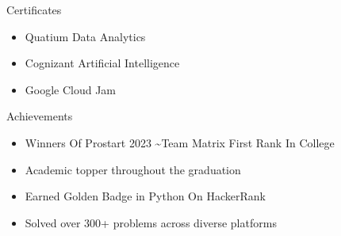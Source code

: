 \documentclass{resume} %
\begin{document}
\begin{rSection}{Certificates} 
\begin{itemize}[leftmargin=0.5in]
    \item Quatium Data Analytics
    \item Cognizant Artificial Intelligence
    \item Google Cloud Jam 
\end{itemize}
\end{rSection}

\begin{rSection}{Achievements} 
\begin{itemize}[leftmargin=0.5in]
    \item Winners Of Prostart 2023 \textasciitilde Team Matrix First Rank In College 
    \item Academic topper throughout the graduation
    \item Earned Golden Badge in Python On HackerRank 
    \item Solved over 300+ problems across diverse platforms  
\end{itemize}
\end{rSection}
\end{document}
